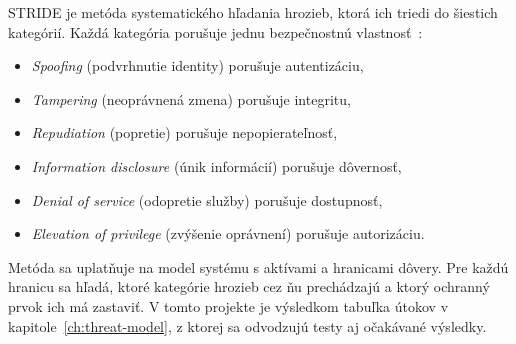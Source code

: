 STRIDE je metóda systematického hľadania hrozieb, ktorá ich triedi do šiestich kategórií. Každá kategória porušuje jednu bezpečnostnú vlastnosť~\cite{shostack2014threat}:

\begin{itemize}
  \item \emph{Spoofing} (podvrhnutie identity) porušuje autentizáciu,
  \item \emph{Tampering} (neoprávnená zmena) porušuje integritu,
  \item \emph{Repudiation} (popretie) porušuje nepopierateľnosť,
  \item \emph{Information disclosure} (únik informácií) porušuje dôvernosť,
  \item \emph{Denial of service} (odopretie služby) porušuje dostupnosť,
  \item \emph{Elevation of privilege} (zvýšenie oprávnení) porušuje autorizáciu.
\end{itemize}

Metóda sa uplatňuje na model systému s aktívami a hranicami dôvery. Pre každú hranicu sa hľadá, ktoré kategórie hrozieb cez ňu prechádzajú a ktorý ochranný prvok ich má zastaviť. V tomto projekte je výsledkom tabuľka útokov v kapitole~\ref{ch:threat-model}, z ktorej sa odvodzujú testy aj očakávané výsledky.
